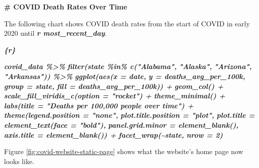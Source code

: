 \documentclass[
]{book}
\newenvironment{Shaded}{\begin{snugshade}}{\end{snugshade}}
\newcommand{\FunctionTok}[1]{\textcolor[rgb]{0.13,0.29,0.53}{\textbf{#1}}}
\newcommand{\InformationTok}[1]{\textcolor[rgb]{0.56,0.35,0.01}{\textbf{\textit{#1}}}}
\newcommand{\NormalTok}[1]{#1}
\begin{document}
\begin{Shaded}
\begin{Highlighting}[]
\FunctionTok{\# COVID Death Rates Over Time}

\NormalTok{The following chart shows COVID death rates from the start of COVID in early 2020 until }\InformationTok{\textasciigrave{}r most\_recent\_day\textasciigrave{}}\NormalTok{.}

\InformationTok{\textasciigrave{}\textasciigrave{}\textasciigrave{}\{r\}}

\InformationTok{covid\_data \%\textgreater{}\% }
\InformationTok{  filter(state \%in\% c("Alabama",}
\InformationTok{                      "Alaska",}
\InformationTok{                      "Arizona",}
\InformationTok{                      "Arkansas")) \%\textgreater{}\% }
\InformationTok{  ggplot(aes(x = date,}
\InformationTok{             y = deaths\_avg\_per\_100k,}
\InformationTok{             group = state,}
\InformationTok{             fill = deaths\_avg\_per\_100k)) +}
\InformationTok{  geom\_col() +}
\InformationTok{  scale\_fill\_viridis\_c(option = "rocket") +}
\InformationTok{  theme\_minimal() +}
\InformationTok{  labs(title = "Deaths per 100,000 people over time") +}
\InformationTok{  theme(legend.position = "none",}
\InformationTok{        plot.title.position = "plot",}
\InformationTok{        plot.title = element\_text(face = "bold"),}
\InformationTok{        panel.grid.minor = element\_blank(),}
\InformationTok{        axis.title = element\_blank()) +}
\InformationTok{  facet\_wrap(\textasciitilde{}state,}
\InformationTok{             nrow = 2)}
\InformationTok{\textasciigrave{}\textasciigrave{}\textasciigrave{}}
\end{Highlighting}
\end{Shaded}

Figure \ref{fig:covid-website-static-page} shows what the website's home page now looks like.
\end{document}
